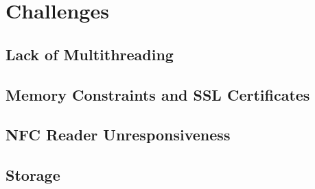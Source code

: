 \section{Challenges}

\subsection{Lack of Multithreading}

\subsection{Memory Constraints and SSL Certificates}

\subsection{NFC Reader Unresponsiveness}

\subsection{Storage}
